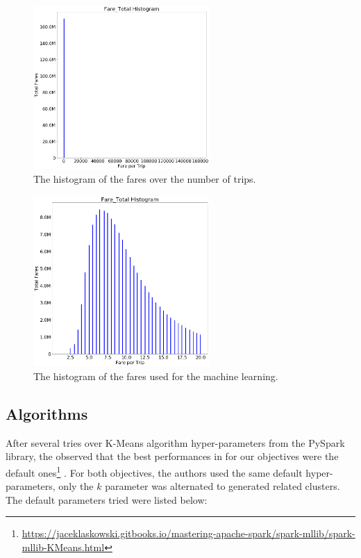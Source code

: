 \documentclass[a4paper]{article}
\begin{document}
\begin{figure}
  \centering
  \includegraphics[width=0.6\textwidth]{images/distribution-fares-bad.png}
  \caption{The histogram of the fares over the number of trips.}
  \label{fig:distribution-fares-bad}
\end{figure}

\begin{figure}
  \centering
  \includegraphics[width=0.6\textwidth]{images/distribution-fares-fix.png}
  \caption{The histogram of the fares used for the machine learning.}
  \label{fig:distribution-fares-fixed}
\end{figure}


\subsection{Algorithms}
After several tries over K-Means algorithm hyper-parameters from the PySpark library, the observed that the best performances in for our objectives were the default ones\footnote{\url{https://jaceklaskowski.gitbooks.io/mastering-apache-spark/spark-mllib/spark-mllib-KMeans.html}} . For both objectives, the authors used the same default hyper-parameters, only the $k$ parameter was alternated to generated related clusters. The default parameters tried were listed below:
\end{document}
